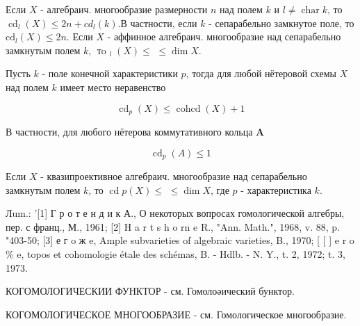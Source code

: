 \documentclass[10pt]{article}
\begin{document}
Если $X$ - алгебраич. многообразие размерности $n$ над полем $k$ и $l \neq \operatorname{char} k$, то $\operatorname{cd}_{l}(X) \leqslant 2 n+c d_{l}(k)$.В частности, если $k$ - сепарабельно замкнутое поле, то $\mathrm{cd}_{l}(X) \leqslant 2 n$. Если $X$ - аффинное алгебраич. многообразие над сепарабельно замкнутым полем $k$, $\operatorname{тo~}_{l}(X) \leqslant$ $\leqslant \operatorname{dim} X$.



Пусть $k$ - поле конечной характеристики $p$, тогда для любой нётеровой схемы $X$ над полем $k$ имеет место неравенство



\[

\operatorname{cd}_{p}(X) \leqslant \operatorname{cohcd}(X)+1

\]



В частности, для любого нётерова коммутативного кольца $\boldsymbol{A}$



\[

\operatorname{cd}_{p}(A) \leqslant 1

\]



Если $X$ - квазипроективное алгебраич. многообразие над сепарабельно замкнутым полем $k$, то $\operatorname{cd} p(X) \leqslant$ $\leqslant \operatorname{dim} X$, где $p$ - характеристика $k$.



Лum.: '[1] Г р о т е н д и к А., О некоторых вопросах гомологической алгебры, пер. с франц., М., 1961; [2] H a r t s h o rn e R., "Ann. Math.", 1968, v. 88, p. "403-50; [3] е г o ж e, Ample subvarieties of algebraic varieties, B., 1970; [ [ ] e r o \% e, topos et cohomologie étale des schémas, B. - Hdlb. - N. Y., t. 2, 1972; t. 3, 1973.



КОГОМОЛОГИЧЕСКИИ ФУНКТОР - см. Гомолоәический бунктор.



КОГОМОЛОГИЧЕСКОЕ МНОГООБРАЗИЕ - см. Гомологическое многообразие.
\end{document}
